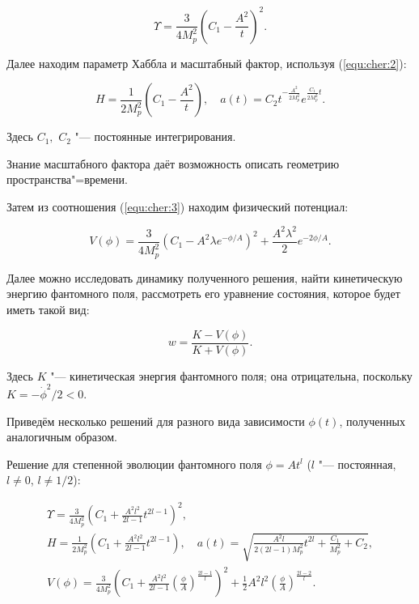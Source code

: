 \begin{equation*}

\Upsilon= \frac{3}{4M_p^2}\left(C_1-\frac{A^2}{t}\right)^2.

\end{equation*}

Далее находим параметр Хаббла и масштабный фактор, используя (\ref{equ:cher:2}):

\begin{equation*}

H=\frac{1}{2M_p^2}\left(C_1-\frac{A^2}{t}\right),\quad a(t)=C_2t^{-\frac{A^2}{2M_p^2}}e^{\frac{C_1}{2M_p^2}t}.

\end{equation*}

Здесь $C_1,$ $C_2$ "--- постоянные интегрирования. 

Знание масштабного фактора даёт возможность описать геометрию пространства"=времени.

Затем из соотношения (\ref{equ:cher:3}) находим физический потенциал:

\begin{equation*}

V(\phi)=\frac{3}{4M_p^2}\left(C_1-A^2\lambda

e^{-\phi/A}\right)^2+\frac{A^2\lambda^2}{2}e^{-2\phi/A}.

\end{equation*}

Далее можно исследовать динамику полученного решения, найти кинетическую энергию фантомного поля, рассмотреть его уравнение состояния, которое будет иметь такой вид:

\begin{equation} \label{equ:cher:eos}

w=\frac{K-V(\phi)}{K+V(\phi)}.

\end{equation}

Здесь $K$ "--- кинетическая энергия фантомного поля; она отрицательна, поскольку $ K = - \dot{\phi}^2 /2 <0 $.



Приведём несколько решений для разного вида зависимости $\phi(t)$, полученных аналогичным образом.

Решение для степенной эволюции фантомного поля $ \phi =A t^l $ ($l$ "--- постоянная, $ l\neq 0 $, $ l\neq 1/2 $):

\begin{gather*}

\Upsilon=\frac{3}{4M_p^2}\left(C_1 +\frac{A^2l^2}{2l-1}t^{2l-1}\right)^2,\\

H=\frac{1}{2M_p^2}\left(C_1 +\frac{A^2l^2}{2l-1}t^{2l-1}\right), \quad 

a(t)= \sqrt{\frac{A^2l}{2(2l-1)M_p^2}t^{2l}+\frac{C_1}{M_p^2}+C_2},\\

V(\phi)=\frac{3}{4M_p^2}\left(C_1 +\frac{A^2l^2}{2l-1} \left(\frac{\phi}{A}\right)^{\frac{2l-1}{l}}\right)^2+ \frac{1}{2}A^2l^2 \left(\frac{\phi}{A}\right)^{\frac{2l-2}{l}}.

\end{gather*}


